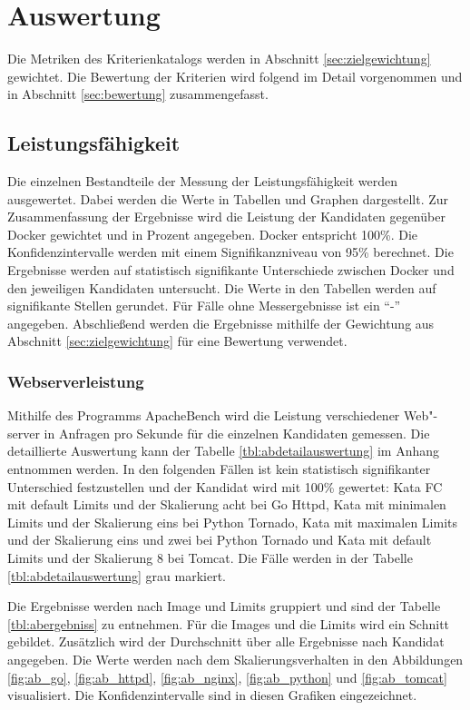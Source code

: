 \chapter{Auswertung}
\label{ch:auswertung}

Die Metriken des Kriterienkatalogs werden in Abschnitt \ref{sec:zielgewichtung} gewichtet. Die Bewertung der Kriterien wird folgend im Detail vorgenommen und in Abschnitt \ref{sec:bewertung} zusammengefasst.

\section{Leistungsfähigkeit}
Die einzelnen Bestandteile der Messung der Leistungsfähigkeit werden ausgewertet. Dabei werden die Werte in Tabellen und Graphen dargestellt. Zur Zusammenfassung der Ergebnisse wird die Leistung der Kandidaten gegenüber Docker gewichtet und in Prozent angegeben. Docker entspricht 100\%. Die Konfidenzintervalle werden mit einem Signifikanzniveau von 95\% berechnet. Die Ergebnisse werden auf statistisch signifikante Unterschiede zwischen Docker und den jeweiligen Kandidaten untersucht. Die Werte in den Tabellen werden auf signifikante Stellen gerundet. Für Fälle ohne Messergebnisse ist ein "`-"' angegeben. Abschließend werden die Ergebnisse mithilfe der Gewichtung aus Abschnitt \ref{sec:zielgewichtung} für eine Bewertung verwendet.

\subsection{Webserverleistung}
Mithilfe des Programms ApacheBench wird die Leistung verschiedener Web"-server in Anfragen pro Sekunde für die einzelnen Kandidaten gemessen. Die detaillierte Auswertung kann der Tabelle \ref{tbl:abdetailauswertung} im Anhang entnommen werden. In den folgenden Fällen ist kein statistisch signifikanter Unterschied festzustellen und der Kandidat wird mit 100\% gewertet: Kata FC mit default Limits und der Skalierung acht bei Go Httpd, Kata mit minimalen Limits und der Skalierung eins bei Python Tornado, Kata mit maximalen Limits und der Skalierung eins und zwei bei Python Tornado und Kata mit default Limits und der Skalierung 8 bei Tomcat. Die Fälle werden in der Tabelle \ref{tbl:abdetailauswertung} grau markiert.

Die Ergebnisse werden nach Image und Limits gruppiert und sind der Tabelle \ref{tbl:abergebniss} zu entnehmen. Für die Images und die Limits wird ein Schnitt gebildet. Zusätzlich wird der Durchschnitt über alle Ergebnisse nach Kandidat angegeben. Die Werte werden nach dem Skalierungsverhalten in den Abbildungen \ref{fig:ab_go}, \ref{fig:ab_httpd}, \ref{fig:ab_nginx}, \ref{fig:ab_python} und \ref{fig:ab_tomcat} visualisiert. Die Konfidenzintervalle sind in diesen Grafiken eingezeichnet.

